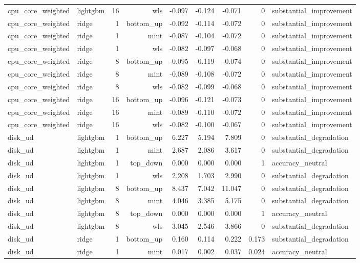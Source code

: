 \begin{tabular}{llrrrrrrl}
cpu_core_weighted & lightgbm & 16 & wls & -0.097 & -0.124 & -0.071 & 0 & substantial_improvement \\
cpu_core_weighted & ridge & 1 & bottom_up & -0.092 & -0.114 & -0.072 & 0 & substantial_improvement \\
cpu_core_weighted & ridge & 1 & mint & -0.087 & -0.104 & -0.072 & 0 & substantial_improvement \\
cpu_core_weighted & ridge & 1 & wls & -0.082 & -0.097 & -0.068 & 0 & substantial_improvement \\
cpu_core_weighted & ridge & 8 & bottom_up & -0.095 & -0.119 & -0.074 & 0 & substantial_improvement \\
cpu_core_weighted & ridge & 8 & mint & -0.089 & -0.108 & -0.072 & 0 & substantial_improvement \\
cpu_core_weighted & ridge & 8 & wls & -0.082 & -0.099 & -0.068 & 0 & substantial_improvement \\
cpu_core_weighted & ridge & 16 & bottom_up & -0.096 & -0.121 & -0.073 & 0 & substantial_improvement \\
cpu_core_weighted & ridge & 16 & mint & -0.089 & -0.110 & -0.072 & 0 & substantial_improvement \\
cpu_core_weighted & ridge & 16 & wls & -0.082 & -0.100 & -0.067 & 0 & substantial_improvement \\
disk_ud & lightgbm & 1 & bottom_up & 6.227 & 5.194 & 7.809 & 0 & substantial_degradation \\
disk_ud & lightgbm & 1 & mint & 2.687 & 2.086 & 3.617 & 0 & substantial_degradation \\
disk_ud & lightgbm & 1 & top_down & 0.000 & 0.000 & 0.000 & 1 & accuracy_neutral \\
disk_ud & lightgbm & 1 & wls & 2.208 & 1.703 & 2.990 & 0 & substantial_degradation \\
disk_ud & lightgbm & 8 & bottom_up & 8.437 & 7.042 & 11.047 & 0 & substantial_degradation \\
disk_ud & lightgbm & 8 & mint & 4.046 & 3.385 & 5.175 & 0 & substantial_degradation \\
disk_ud & lightgbm & 8 & top_down & 0.000 & 0.000 & 0.000 & 1 & accuracy_neutral \\
disk_ud & lightgbm & 8 & wls & 3.045 & 2.546 & 3.866 & 0 & substantial_degradation \\
disk_ud & ridge & 1 & bottom_up & 0.160 & 0.114 & 0.222 & 0.173 & substantial_degradation \\
disk_ud & ridge & 1 & mint & 0.017 & 0.002 & 0.037 & 0.024 & accuracy_neutral \\

\end{tabular}
